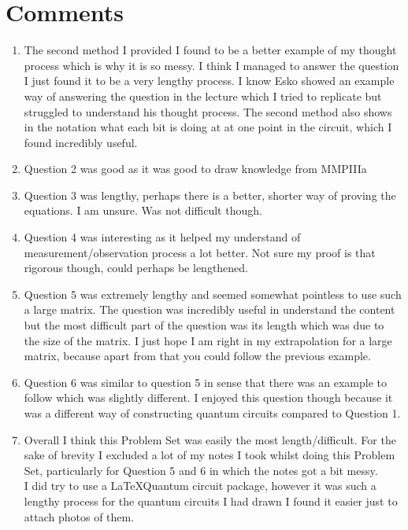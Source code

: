\documentclass[12pt]{article}
\begin{document}
\section{Comments}
\begin{enumerate}
    \item The second method I provided I found to be a better example of my thought process which is why it is so messy. I think I managed to answer the question I just found it to be a very lengthy process. I know Esko showed an example way of answering the question in the lecture which I tried to replicate but struggled to understand his thought process. The second method also shows in the notation what each bit is doing at at one point in the circuit, which I found incredibly useful. 
    \item Question 2 was good as it was good to draw knowledge from MMPIIIa
    \item Question 3 was lengthy, perhaps there is a better, shorter way of proving the equations. I am unsure. Was not difficult though.
    \item Question 4 was interesting as it helped my understand of measurement/observation process a lot better. Not sure my proof is that rigorous though, could perhaps be lengthened. 
    \item Question 5 was extremely lengthy and seemed somewhat pointless to use such a large matrix. The question was incredibly useful in understand the content but the most difficult part of the question was its length which was due to the size of the matrix. I just hope I am right in my extrapolation for a large matrix, because apart from that you could follow the previous example. 
    \item Question 6 was similar to question 5 in sense that there was an example to follow which was slightly different. I enjoyed this question though because it was a different way of constructing quantum circuits compared to Question 1.
    \item Overall I think this Problem Set was easily the most length/difficult. For the sake of brevity I excluded a lot of my notes I took whilst doing this Problem Set, particularly for Question 5 and 6 in which the notes got a bit messy. 
    \\
    I did try to use a \LaTeX Quantum circuit package, however it was such a lengthy process for the quantum circuits I had drawn I found it easier just to attach photos of them.

\end{enumerate}
\end{document}
